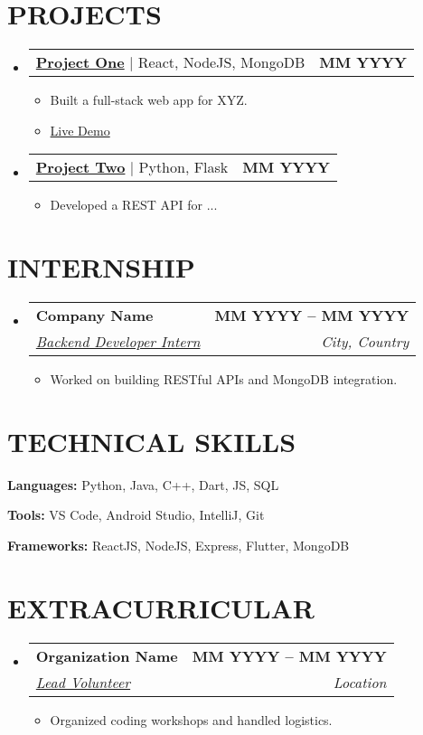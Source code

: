 \documentclass[letterpaper,11pt]{article}
\makeatletter
\newcommand{\resumeItem}[1]{
    \item\small{
            {#1 \vspace{-2pt}}
    }
}
\newcommand{\resumeSubheading}[4]{
    \vspace{-2pt}\item
    \begin{tabular*}{1.0\textwidth}[t]{l@{\extracolsep{\fill}}r}
        \textbf{\large#1} & \textbf{\small #2} \\
        \textit{\large#3} & \textit{\small #4} \\
    \end{tabular*}\vspace{-7pt}
}
\newcommand{\resumeProjectHeading}[2]{
    \item
    \begin{tabular*}{1.001\textwidth}{l@{\extracolsep{\fill}}r}
        \small#1 & \textbf{\small #2}\\
    \end{tabular*}\vspace{-7pt}
}
\newcommand{\resumeSubHeadingListStart}{\begin{itemize}[leftmargin=0.0in, label={}]}
\newcommand{\resumeSubHeadingListEnd}{\end{itemize}}
\newcommand{\resumeItemListStart}{\begin{itemize}}
\newcommand{\resumeItemListEnd}{\end{itemize}\vspace{-5pt}}
\makeatother
\begin{document}
\section{PROJECTS}
\resumeSubHeadingListStart
\resumeProjectHeading
{\href{https://projectlink.com}{\textbf{Project One}} $|$ React, NodeJS, MongoDB}{MM YYYY}
\resumeItemListStart
\resumeItem{Built a full-stack web app for XYZ.}
\resumeItem{\href{https://liveproject.com}{Live Demo}}
\resumeItemListEnd

\resumeProjectHeading
{\href{https://projectlink.com}{\textbf{Project Two}} $|$ Python, Flask}{MM YYYY}
\resumeItemListStart
\resumeItem{Developed a REST API for ...}
\resumeItemListEnd
\resumeSubHeadingListEnd

\section{INTERNSHIP}
\resumeSubHeadingListStart
\resumeSubheading
{Company Name \href{https://certificate.com}{\faExternalLinkAlt}}{MM YYYY -- MM YYYY}
{\underline{Backend Developer Intern}}{City, Country}
\resumeItemListStart
\resumeItem{Worked on building RESTful APIs and MongoDB integration.}
\resumeItemListEnd
\resumeSubHeadingListEnd

\section{TECHNICAL SKILLS}
\begin{itemize}[leftmargin=0.15in, label={}]\small{
\item \textbf{Languages:} Python, Java, C++, Dart, JS, SQL \\
\item \textbf{Tools:} VS Code, Android Studio, IntelliJ, Git \\
\item \textbf{Frameworks:} ReactJS, NodeJS, Express, Flutter, MongoDB
}
\end{itemize}

\section{EXTRACURRICULAR}
\resumeSubHeadingListStart
\resumeSubheading
{Organization Name \href{https://certificate.com}{\faExternalLinkAlt}}{MM YYYY -- MM YYYY}
{\underline{Lead Volunteer}}{Location}
\resumeItemListStart
\resumeItem{Organized coding workshops and handled logistics.}
\resumeItemListEnd
\resumeSubHeadingListEnd
\end{document}
